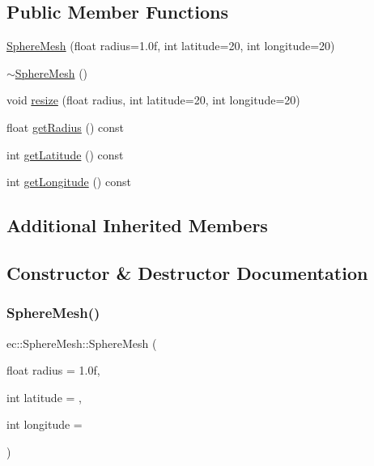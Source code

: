 \subsection*{Public Member Functions}
\begin{DoxyCompactItemize}
\item 
\mbox{\hyperlink{classec_1_1_sphere_mesh_aef9a67fadbe115ae17af30d5f07c232d}{Sphere\+Mesh}} (float radius=1.\+0f, int latitude=20, int longitude=20)
\item 
\mbox{\hyperlink{classec_1_1_sphere_mesh_ac2d7dd9ad61b5061644259f4c84df00b}{$\sim$\+Sphere\+Mesh}} ()
\item 
void \mbox{\hyperlink{classec_1_1_sphere_mesh_af3d2617313d7ed747408a75adcd32fc5}{resize}} (float radius, int latitude=20, int longitude=20)
\item 
float \mbox{\hyperlink{classec_1_1_sphere_mesh_a4f994d66fe769ebeac0d9a560b5a9313}{get\+Radius}} () const
\item 
int \mbox{\hyperlink{classec_1_1_sphere_mesh_a6531d4834364a3748a7f005112f779d2}{get\+Latitude}} () const
\item 
int \mbox{\hyperlink{classec_1_1_sphere_mesh_a67a02f8c8d5f9f65666ab4a67c502ec3}{get\+Longitude}} () const
\end{DoxyCompactItemize}
\subsection*{Additional Inherited Members}


\subsection{Constructor \& Destructor Documentation}
\mbox{\label{classec_1_1_sphere_mesh_aef9a67fadbe115ae17af30d5f07c232d}} 
\subsubsection{\texorpdfstring{Sphere\+Mesh()}{SphereMesh()}}
{\footnotesize\ttfamily ec\+::\+Sphere\+Mesh\+::\+Sphere\+Mesh (\begin{DoxyParamCaption}\item[{float}]{radius = {\ttfamily 1.0f},  }\item[{int}]{latitude = {},  }\item[{int}]{longitude = {} }\end{DoxyParamCaption})\hspace{0.3cm}{\ttfamily [explicit]}}

